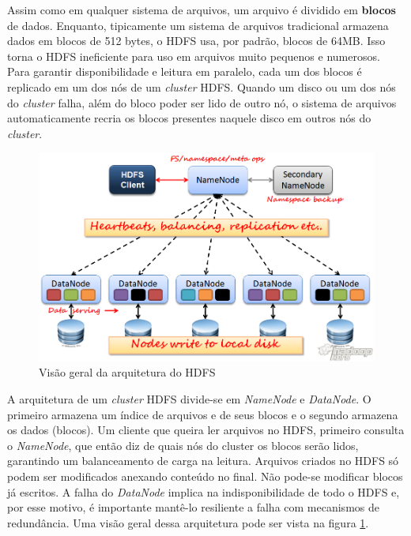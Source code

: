 Assim como em qualquer sistema de arquivos, um arquivo é dividido em \textbf{blocos} de dados. Enquanto, tipicamente um sistema de arquivos tradicional armazena dados em blocos de 512 bytes, o HDFS usa, por padrão, blocos de 64MB. Isso torna o HDFS ineficiente para uso em arquivos muito pequenos e numerosos. Para garantir disponibilidade e leitura em paralelo, cada um dos blocos é replicado em um dos nós de um \textit{cluster} HDFS. Quando um disco ou um dos nós do \textit{cluster} falha, além do bloco poder ser lido de outro nó, o sistema de arquivos automaticamente recria os blocos presentes naquele disco em outros nós do \textit{cluster}.
\begin{figure}
	\centering
	\includegraphics[width=\linewidth]{./hdfs_architecture.png}
	\caption{Visão geral da arquitetura do HDFS}
	\label{fig:hdfs_arch}
\end{figure}

A arquitetura de um \textit{cluster} HDFS divide-se em \textit{NameNode} e \textit{DataNode}. O primeiro armazena um índice de arquivos e de seus blocos e o segundo armazena os dados (blocos). Um cliente que queira ler arquivos no HDFS, primeiro consulta o \textit{NameNode}, que então diz de quais nós do cluster os blocos serão lidos, garantindo um balanceamento de carga na leitura. Arquivos criados no HDFS só podem ser modificados anexando conteúdo no final. Não pode-se modificar blocos já escritos. A falha do \textit{DataNode} implica na indisponibilidade de todo o HDFS e, por esse motivo, é importante mantê-lo resiliente a falha com mecanismos de redundância. Uma visão geral dessa arquitetura pode ser vista na figura \ref{fig:hdfs_arch}.

